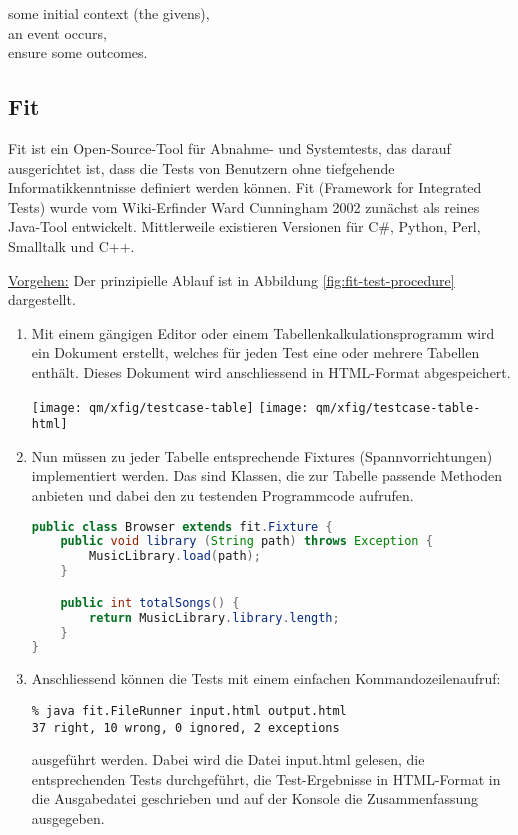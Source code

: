  some initial context (the givens),\\
 an event occurs,\\
 ensure some outcomes.
\newslide
%
\subsection{Fit}
Fit ist ein Open-Source-Tool für Abnahme- und Systemtests, das
darauf ausgerichtet ist, dass die Tests von Benutzern ohne tiefgehende
Informatikkenntnisse definiert werden können.
Fit (Framework for Integrated Tests) wurde vom Wiki-Erfinder Ward Cunningham
2002 zunächst als reines Java-Tool entwickelt. Mittlerweile existieren
Versionen für C\#, Python, Perl, Smalltalk und C++.

\ifslides
\newslide
\underline{Vorgehen:}
\else
Der prinzipielle Ablauf ist in Abbildung \ref{fig:fit-test-procedure}
dargestellt.
\fi
\begin{enumerate}
\item Mit einem gängigen Editor oder einem
Tabellenkalkulationsprogramm wird ein Dokument erstellt, welches für jeden
Test eine oder mehrere Tabellen enthält.
Dieses Dokument wird anschliessend in HTML-Format abgespeichert.

\texttt{[image: qm/xfig/testcase-table]}
\hfill
\texttt{[image: qm/xfig/testcase-table-html]}
\newslide
\item Nun müssen zu jeder Tabelle entsprechende
Fixtures (Spannvorrichtungen) implementiert werden. Das sind Klassen, die
zur Tabelle passende Methoden anbieten und dabei den zu testenden Programmcode
aufrufen.
\begin{lstlisting}[language=java]
public class Browser extends fit.Fixture {
    public void library (String path) throws Exception {
        MusicLibrary.load(path);
    }

    public int totalSongs() {
        return MusicLibrary.library.length;
    }
}
\end{lstlisting}
\newslide
\item Anschliessend können die Tests mit einem einfachen
Kommandozeilenaufruf:
\begin{verbatim}
% java fit.FileRunner input.html output.html
37 right, 10 wrong, 0 ignored, 2 exceptions
\end{verbatim}
ausgeführt werden. Dabei wird die Datei input.html gelesen, die
entsprechenden Tests durchgeführt,
die Test-Ergebnisse in HTML-Format
in die Ausgabedatei
geschrieben und auf der Konsole die Zusammenfassung ausgegeben.
\end{enumerate}


